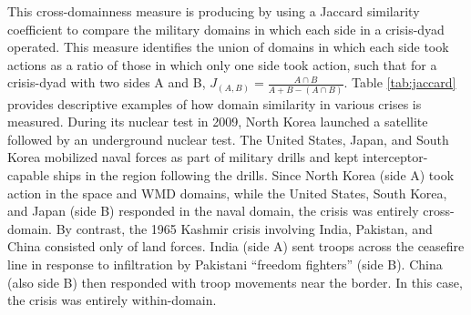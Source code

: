 \documentclass[
]{article}
\begin{document}
This cross-domainness measure is producing by using a Jaccard similarity coefficient to compare the military domains in which each side in a crisis-dyad operated. This measure identifies the union of domains in which each side took actions as a ratio of those in which only one side took action, such that for a crisis-dyad with two sides A and B, \(J_{(A, B)} = \frac{A \cap B}{A + B - (A \cap B)}\). Table \ref{tab:jaccard} provides descriptive examples of how domain similarity in various crises is measured. During its nuclear test in 2009, North Korea launched a satellite followed by an underground nuclear test. The United States, Japan, and South Korea mobilized naval forces as part of military drills and kept interceptor-capable ships in the region following the drills. Since North Korea (side A) took action in the space and WMD domains, while the United States, South Korea, and Japan (side B) responded in the naval domain, the crisis was entirely cross-domain. By contrast, the 1965 Kashmir crisis involving India, Pakistan, and China consisted only of land forces. India (side A) sent troops across the ceasefire line in response to infiltration by Pakistani ``freedom fighters'' (side B). China (also side B) then responded with troop movements near the border. In this case, the crisis was entirely within-domain.
\end{document}
